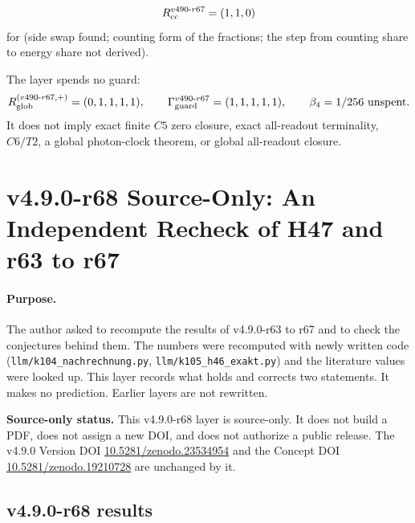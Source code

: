 \[
R_{\rm cc}^{v490\text{-}r67}=(1,1,0)
\]
for (side swap found; counting form of the fractions; the step from counting share to energy share not derived).

The layer spends no guard:
\[
R_{\rm glob}^{(v490\text{-}r67,+)}=(0,1,1,1,1),
\qquad
\Gamma_{\rm guard}^{v490\text{-}r67}=(1,1,1,1,1),
\qquad
\beta_4=1/256\ \text{unspent}.
\]
It does not imply exact finite \(C5\) zero closure, exact all-readout terminality,
\(C6/T2\), a global photon-clock theorem, or global all-readout closure.

\clearpage
\section*{v4.9.0-r68 Source-Only: An Independent Recheck of H47 and r63 to r67}
\label{sec:v490-r68-recheck}

\paragraph{Purpose.}
The author asked to recompute the results of v4.9.0-r63 to r67 and to check the conjectures behind them.  The numbers were recomputed with newly written code
(\texttt{llm/k104\_nachrechnung.py}, \texttt{llm/k105\_h46\_exakt.py}) and the literature values were looked up.  This layer records what holds and corrects two
statements.  It makes no prediction.  Earlier layers are not rewritten.

\noindent\textbf{Source-only status.}
This v4.9.0-r68 layer is source-only.  It does not build a PDF, does not assign a new DOI,
and does not authorize a public release.  The v4.9.0 Version DOI
\href{https://doi.org/10.5281/zenodo.23534954}{10.5281/zenodo.23534954} and the Concept DOI
\href{https://doi.org/10.5281/zenodo.19210728}{10.5281/zenodo.19210728} are unchanged by it.

\subsection*{v4.9.0-r68 results}
\label{subsec:v490-r68-results}

